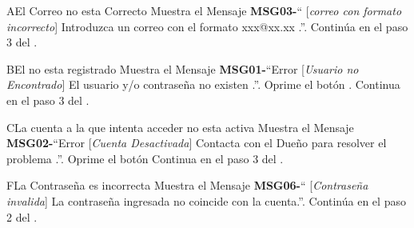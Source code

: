 	\begin{UCtrayectoriaA}{A}{El Correo no esta Correcto}
			\UCpaso Muestra el Mensaje {\bf MSG03-}`` [{\em correo con formato incorrecto}] Introduzca un correo con el formato xxx@xx.xx .''.
			\UCpaso Continúa en el paso 3 del .
		\end{UCtrayectoriaA}
		\begin{UCtrayectoriaA}{B}{El \UCactor no esta registrado}
			\UCpaso Muestra el Mensaje {\bf MSG01-}``Error [{\em Usuario no Encontrado}] El usuario y/o contraseña no existen .''.
			\UCpaso[\UCactor] Oprime el botón .
			\UCpaso[] Continua en el paso 3 del .
		\end{UCtrayectoriaA}		
		\begin{UCtrayectoriaA}{C}{La cuenta a la que intenta acceder no esta activa}
			\UCpaso Muestra el Mensaje {\bf MSG02-}``Error [{\em Cuenta Desactivada}] Contacta con el Dueño para resolver el problema .''.
			\UCpaso[\UCactor] Oprime el botón 
			\UCpaso Continua en el paso 3 del .
		\end{UCtrayectoriaA}
		\begin{UCtrayectoriaA}{F}{La Contraseña es incorrecta}
			\UCpaso Muestra el Mensaje {\bf MSG06-}`` [{\em Contraseña invalida}] La contraseña ingresada no coincide con la cuenta.''.
			\UCpaso Continúa en el paso 2 del .
		\end{UCtrayectoriaA}
